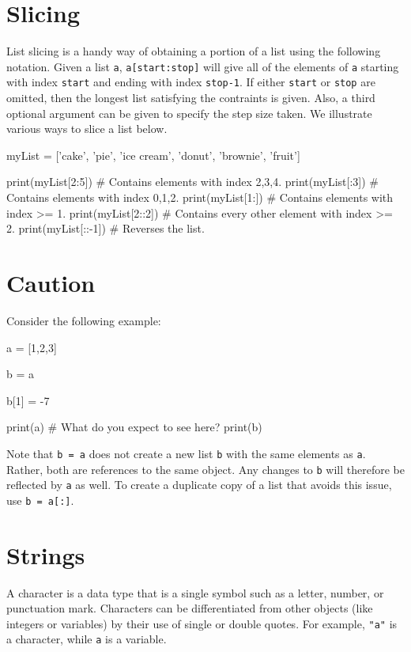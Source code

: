 \documentclass{ximera}
\begin{document}
\section{Slicing}

List slicing is a handy way of obtaining a portion of a list using the following notation. Given a list \verb|a|, \verb|a[start:stop]| will give all of the elements of \verb|a| starting with index \verb|start| and ending with index \verb|stop-1|. If either \verb|start| or \verb|stop| are omitted, then the longest list satisfying the contraints is given. Also, a third optional argument can be given to specify the step size taken. We illustrate various ways to slice a list below.

\begin{sageCell}
myList = ['cake', 'pie', 'ice cream', 'donut', 'brownie', 'fruit']

print(myList[2:5])  # Contains elements with index 2,3,4.
print(myList[:3])   # Contains elements with index 0,1,2.
print(myList[1:])   # Contains elements with index >= 1.
print(myList[2::2]) # Contains every other element with index >= 2.
print(myList[::-1]) # Reverses the list.
\end{sageCell}

\section{Caution}

Consider the following example:

\begin{sageCell}
a = [1,2,3]

b = a

b[1] = -7

print(a) # What do you expect to see here?
print(b)
\end{sageCell}

Note that \verb|b = a| does not create a new list \verb|b| with the same elements as \verb|a|. Rather, both are references to the same object. Any changes to \verb|b| will therefore be reflected by \verb|a| as well. To create a duplicate copy of a list that avoids this issue, use \verb|b = a[:]|.

\section{Strings}

A character is a data type that is a single symbol such as a letter, number, or punctuation mark. Characters can be differentiated from other objects (like integers or variables) by their use of single or double quotes. For example, \verb|"a"| is a character, while \verb|a| is a variable.
\end{document}
